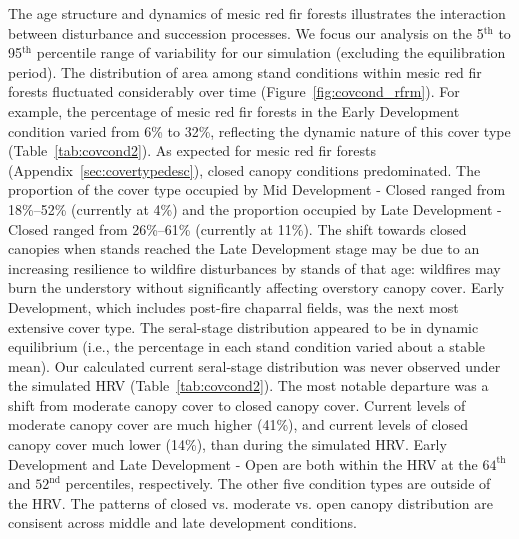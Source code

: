 The age structure and dynamics of mesic red fir forests illustrates the interaction between disturbance and succession processes. We focus our analysis on the 5$^{\text{th}}$ to 95$^{\text{th}}$ percentile range of variability for our simulation (excluding the equilibration period). %
%
The distribution of area among stand conditions within mesic red fir forests fluctuated considerably over time (Figure~\ref{fig:covcond_rfrm}). For example, the percentage of mesic red fir forests in the Early Development condition varied from 6\% to 32\%, reflecting the dynamic nature of this cover type (Table~\ref{tab:covcond2}). As expected for mesic red fir forests (Appendix~\ref{sec:covertypedesc}), closed canopy conditions predominated. The proportion of the cover type occupied by Mid Development - Closed ranged from 18\%--52\% (currently at 4\%) and the proportion occupied by Late Development - Closed ranged from 26\%--61\% (currently at 11\%). The shift towards closed canopies when stands reached the Late Development stage may be due to an increasing resilience to wildfire disturbances by stands of that age: wildfires may burn the understory without significantly affecting overstory canopy cover. Early Development, which includes post-fire chaparral fields, was the next most extensive cover type. %
%
The seral-stage distribution appeared to be in dynamic equilibrium (i.e., the percentage in each stand condition varied about a stable mean). Our calculated current seral-stage distribution was never observed under the simulated HRV (Table~\ref{tab:covcond2}). The most notable departure was a shift from moderate canopy cover to closed canopy cover. Current levels of moderate canopy cover are much higher (41\%), and current levels of closed canopy cover much lower (14\%), than during the simulated HRV. Early Development and Late Development - Open are both within the HRV at the $64^{\text{th}}$ and $52^{\text{nd}}$ percentiles, respectively. The other five condition types are outside of the HRV. The patterns of closed vs. moderate vs. open canopy distribution are consisent across middle and late development conditions.

